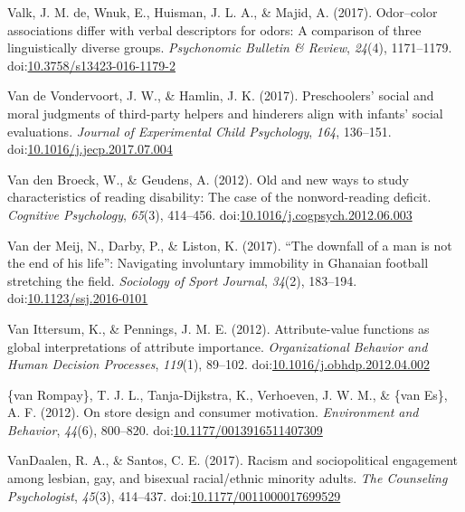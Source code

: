 \documentclass[english,man]{apa6}
\theoremstyle{definition}
\theoremstyle{definition}
\theoremstyle{definition}
\theoremstyle{remark}
\begin{document}
\hypertarget{ref-DeValk2016}{}
Valk, J. M. de, Wnuk, E., Huisman, J. L. A., \& Majid, A. (2017).
Odor--color associations differ with verbal descriptors for odors: A
comparison of three linguistically diverse groups. \emph{Psychonomic
Bulletin \& Review}, \emph{24}(4), 1171--1179.
doi:\href{https://doi.org/10.3758/s13423-016-1179-2}{10.3758/s13423-016-1179-2}

\hypertarget{ref-VandeVondervoort2017}{}
Van de Vondervoort, J. W., \& Hamlin, J. K. (2017). Preschoolers' social
and moral judgments of third-party helpers and hinderers align with
infants' social evaluations. \emph{Journal of Experimental Child
Psychology}, \emph{164}, 136--151.
doi:\href{https://doi.org/10.1016/j.jecp.2017.07.004}{10.1016/j.jecp.2017.07.004}

\hypertarget{ref-VandenBroeck2012}{}
Van den Broeck, W., \& Geudens, A. (2012). Old and new ways to study
characteristics of reading disability: The case of the nonword-reading
deficit. \emph{Cognitive Psychology}, \emph{65}(3), 414--456.
doi:\href{https://doi.org/10.1016/j.cogpsych.2012.06.003}{10.1016/j.cogpsych.2012.06.003}

\hypertarget{ref-Darby2017}{}
Van der Meij, N., Darby, P., \& Liston, K. (2017). ``The downfall of a
man is not the end of his life'': Navigating involuntary immobility in
Ghanaian football stretching the field. \emph{Sociology of Sport
Journal}, \emph{34}(2), 183--194.
doi:\href{https://doi.org/10.1123/ssj.2016-0101}{10.1123/ssj.2016-0101}

\hypertarget{ref-VanIttersum2012}{}
Van Ittersum, K., \& Pennings, J. M. E. (2012). Attribute-value
functions as global interpretations of attribute importance.
\emph{Organizational Behavior and Human Decision Processes},
\emph{119}(1), 89--102.
doi:\href{https://doi.org/10.1016/j.obhdp.2012.04.002}{10.1016/j.obhdp.2012.04.002}

\hypertarget{ref-VanRompay2012}{}
{\{}van Rompay\}, T. J. L., Tanja-Dijkstra, K., Verhoeven, J. W. M., \&
\{van Es\}, A. F. (2012). On store design and consumer motivation.
\emph{Environment and Behavior}, \emph{44}(6), 800--820.
doi:\href{https://doi.org/10.1177/0013916511407309}{10.1177/0013916511407309}

\hypertarget{ref-VanDaalen2017}{}
VanDaalen, R. A., \& Santos, C. E. (2017). Racism and sociopolitical
engagement among lesbian, gay, and bisexual racial/ethnic minority
adults. \emph{The Counseling Psychologist}, \emph{45}(3), 414--437.
doi:\href{https://doi.org/10.1177/0011000017699529}{10.1177/0011000017699529}
\end{document}
